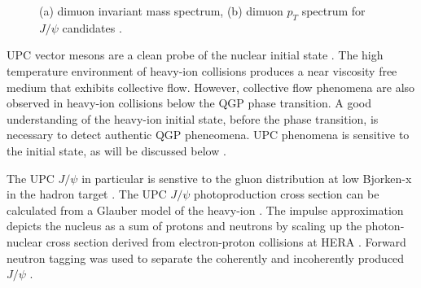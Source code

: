\begin{figure}%
    \centering
    \qquad
    \caption{(a) dimuon invariant mass spectrum, (b) dimuon $p_T$ spectrum for $J/\psi$ candidates \cite{Khachatryan:2016qhq}.}%
    \label{fig:patKennyPlots}%
\end{figure}

UPC vector mesons are a clean probe of the nuclear initial state \cite{Aktas:2006qs,oniaPol}. The high temperature environment of heavy-ion collisions produces a near viscosity free medium that exhibits collective flow. However, collective flow phenomena are also observed in heavy-ion collisions below the QGP phase transition. A good understanding of the heavy-ion initial state, before the phase transition, is necessary to detect authentic QGP pheneomena. UPC phenomena is sensitive to the initial state, as will be discussed below \cite{vmd1999,vmd2000.03}. 

The UPC $J/\psi$ in particular is senstive to the gluon distribution at low Bjorken-x in the hadron target \cite{Teubner:2005sj}. The UPC $J/\psi$ photoproduction cross section can be calculated from a Glauber model of the heavy-ion \cite{Brodsky:1994kf}. The impulse approximation depicts the nucleus as a sum of protons and neutrons by scaling up the photon-nuclear cross section derived from electron-proton collisions at HERA \cite{Miller:2007ri}. Forward neutron tagging was used to separate the coherently and incoherently produced $J/\psi$ \cite{Guzey:2013jaa,Strikman:2005ze,lta2012.03,emPcite4,emPCite5,emPCite6,upcNeuPHENIX}.

